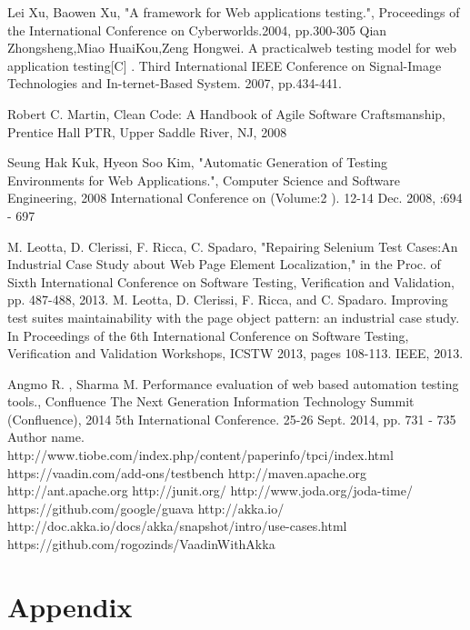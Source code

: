 \documentclass{article}
\begin{document}
 	
	\begin{thebibliography}{7}
	
			Lei Xu, Baowen Xu,
			"A framework for Web applications testing.",
			Proceedings of the International Conference on Cyberworlds.2004, pp.300-305
		Qian Zhongsheng,Miao HuaiKou,Zeng Hongwei.
		 A practicalweb testing model for web application testing[C] .
		 Third International IEEE Conference on Signal-Image Technologies and
		 In-ternet-Based System. 2007, pp.434-441.
		 
		Robert C. Martin,
		Clean Code: A Handbook of Agile Software Craftsmanship,
		Prentice Hall PTR, Upper Saddle River, NJ, 2008
		
		Seung Hak Kuk, Hyeon Soo Kim,			
		"Automatic Generation of Testing Environments for Web Applications.",
		Computer Science and Software Engineering, 2008 International Conference on
		(Volume:2 ). 12-14 Dec. 2008, :694 - 697
		
		M. Leotta, D. Clerissi, F. Ricca, C. Spadaro,
		"Repairing Selenium Test Cases:An Industrial Case Study about Web Page
		 Element Localization," in the Proc. of Sixth International Conference on Software Testing, Verification and Validation, pp. 487-488, 2013. 
		M. Leotta, D. Clerissi, F. Ricca, and C. Spadaro. Improving test suites
		maintainability with the page object pattern: an industrial case study.
		In Proceedings of the 6th International Conference on Software Testing, Verification and Validation Workshops,
		ICSTW 2013, pages 108-113. IEEE, 2013. 
		
		
		Angmo R. , Sharma M.	
		Performance evaluation of web based automation testing tools.,
		Confluence The Next Generation Information Technology Summit (Confluence),
		2014 5th International Conference. 25-26 Sept. 2014, pp. 731 - 735
		 Author name.
		http://www.tiobe.com/index.php/content/paperinfo/tpci/index.html
		https://vaadin.com/add-ons/testbench
		http://maven.apache.org
		http://ant.apache.org
		http://junit.org/
		http://www.joda.org/joda-time/
		https://github.com/google/guava
		http://akka.io/
		http://doc.akka.io/docs/akka/snapshot/intro/use-cases.html
		https://github.com/rogozinds/VaadinWithAkka
	\end{thebibliography}
  \section {Appendix}
  
\end{document}
